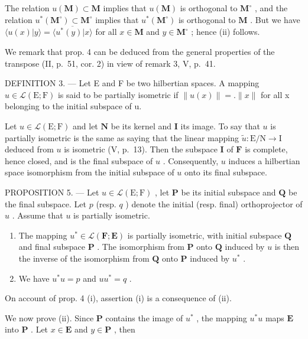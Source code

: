 The relation \(u(\mathbf{M}) \subset \mathbf{M}\) implies that \(u(\mathbf{M})\) is orthogonal to \(\mathbf{M}^{\circ}\) , and the relation \(u^{*}(\mathbf{M}^{\circ}) \subset \mathbf{M}^{\circ}\) implies that \(u^{*}(\mathbf{M}^{\circ})\) is orthogonal to \(\mathbf{M}\) . But we have \(\langle u(x)|y\rangle = \overline{\langle u^{*}(y)|x\rangle}\) for all \(x \in \mathbf{M}\) and \(y \in \mathbf{M}^{\circ}\) ; hence (ii) follows.

We remark that prop. 4 can be deduced from the general properties of the transpose (II, p.~51, cor. 2) in view of remark 3, V, p.~41.

DEFINITION 3. --- Let E and F be two hilbertian spaces. A mapping \(u \in \mathcal{L}(\mathrm{E};\mathrm{F})\) is said to be partially isometric if \(\|u(x)\| = .\|x\|\) for all x belonging to the initial subspace of u.

Let \(u \in \mathcal{L}(\mathrm{E};\mathrm{F})\) and let \(\mathbf{N}\) be its kernel and \(\mathbf{I}\) its image. To say that \(u\) is partially isometric is the same as saying that the linear mapping \(\tilde{u}: \mathrm{E/N} \to \mathrm{I}\) deduced from \(u\) is isometric (V, p.~13). Then the subspace \(\mathbf{I}\) of \(\mathbf{F}\) is complete, hence closed, and is the final subspace of \(u\) . Consequently, \(u\) induces a hilbertian space isomorphism from the initial subspace of \(u\) onto its final subspace.

PROPOSITION 5. --- Let \(u \in \mathcal{L}(\mathrm{E};\mathrm{F})\) , let \(\mathbf{P}\) be its initial subspace and \(\mathbf{Q}\) be the final subspace. Let \(p\) (resp. \(q\) ) denote the initial (resp. final) orthoprojector of \(u\) . Assume that \(u\) is partially isometric.

\begin{enumerate}
\def\labelenumi{(\roman{enumi})}
\item
  The mapping \(u^{*} \in \mathcal{L}(\mathbf{F};\mathbf{E})\) is partially isometric, with initial subspace \(\mathbf{Q}\) and final subspace \(\mathbf{P}\) . The isomorphism from \(\mathbf{P}\) onto \(\mathbf{Q}\) induced by \(u\) is then the inverse of the isomorphism from \(\mathbf{Q}\) onto \(\mathbf{P}\) induced by \(u^{*}\) .
\item
  We have \(u^{*}u = p\) and \(uu^{*} = q\) .
\end{enumerate}

On account of prop. 4 (i), assertion (i) is a consequence of (ii).

We now prove (ii). Since \(\mathbf{P}\) contains the image of \(u^{*}\) , the mapping \(u^{*}u\) maps \(\mathbf{E}\) into \(\mathbf{P}\) . Let \(x \in \mathbf{E}\) and \(y \in \mathbf{P}\) , then

